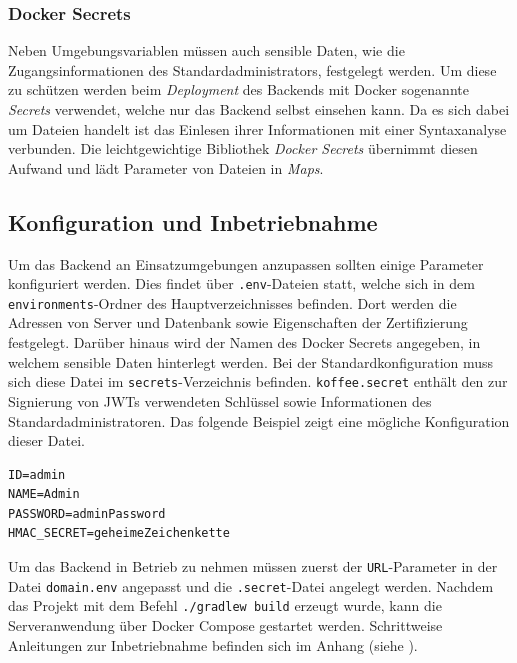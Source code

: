 \documentclass[a4paper, 11pt]{article}
\begin{document}
\subsubsection{Docker Secrets}
\label{subsubsec:backend:bibs:dockersecrets}
Neben Umgebungsvariablen müssen auch sensible Daten, wie die Zugangsinformationen des Standardadministrators, festgelegt werden.
Um diese zu schützen werden beim \textit{Deployment} des Backends mit Docker sogenannte \textit{Secrets} verwendet, welche nur das Backend selbst einsehen kann.
Da es sich dabei um Dateien handelt ist das Einlesen ihrer Informationen mit einer Syntaxanalyse verbunden.
Die leichtgewichtige Bibliothek \textit{Docker Secrets} übernimmt diesen Aufwand und lädt Parameter von Dateien in \textit{Maps}.

\subsection{Konfiguration und Inbetriebnahme}
\label{subsec:backend:configuration}
Um das Backend an Einsatzumgebungen anzupassen sollten einige Parameter konfiguriert werden.
Dies findet über \verb|.env|-Dateien statt, welche sich in dem \verb|environments|-Ordner des Hauptverzeichnisses befinden.
Dort werden die Adressen von Server und Datenbank sowie Eigenschaften der Zertifizierung festgelegt.
Darüber hinaus wird der Namen des Docker Secrets angegeben, in welchem sensible Daten hinterlegt werden.
Bei der Standardkonfiguration muss sich diese Datei im \verb|secrets|-Verzeichnis befinden.
\verb|koffee.secret| enthält den zur Signierung von JWTs verwendeten Schlüssel sowie Informationen des Standardadministratoren.
Das folgende Beispiel zeigt eine mögliche Konfiguration dieser Datei.
\begin{lstlisting}[style=simpleListing, title={Beispielinhalt von /secrets/koffee.secret}]
ID=admin
NAME=Admin
PASSWORD=adminPassword
HMAC_SECRET=geheimeZeichenkette
\end{lstlisting}
Um das Backend in Betrieb zu nehmen müssen zuerst der \verb|URL|-Parameter in der Datei \verb|domain.env| angepasst und die \verb|.secret|-Datei angelegt werden.
Nachdem das Projekt mit dem Befehl \verb|./gradlew build| erzeugt wurde, kann die Serveranwendung über Docker Compose gestartet werden.
Schrittweise Anleitungen zur Inbetriebnahme befinden sich im Anhang (siehe ).
\end{document}
